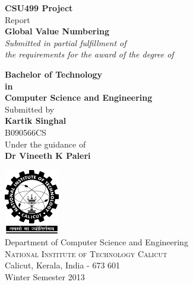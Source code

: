 \begin{titlepage}

\begin{center}

\textup{\small {\bf CSU499 Project} \\ Report}\\[0.4in]

\Large \textbf {Global Value Numbering}\\[0.5in]

       \small \emph{Submitted in partial fulfillment of\\
        the requirements for the award of the degree of}
        \vspace{.2in}

       {\bf Bachelor of Technology \\in\\ Computer Science and Engineering}\\[0.5in]

\normalsize Submitted by \\[0.2in]
\textbf {Kartik Singhal} \\ 
B090566CS\\

\vspace{.3in}
Under the guidance of\\
{\textbf{Dr Vineeth K Paleri}}\\
\vfill


\includegraphics[width=0.18\textwidth]{./nitc-logo}\\[0.2in]
\Large{Department of Computer Science and Engineering}\\
\normalsize
\textsc{National Institute of Technology Calicut}\\
Calicut, Kerala, India - 673 601 \\
\vspace{0.5cm}
Winter Semester 2013

\end{center}

\end{titlepage}
